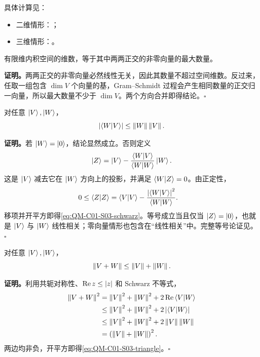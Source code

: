 具体计算见：
\begin{itemize}
  \item 二维情形：；
  \item 三维情形：。
\end{itemize}


\begin{theorem}
有限维内积空间的维数，等于其中两两正交的非零向量的最大数量。
\end{theorem}

\textbf{证明。}两两正交的非零向量必然线性无关，因此其数量不超过空间维数。反过来，任取一组包含 $\dim V$ 个向量的基，Gram--Schmidt 过程会产生相同数量的正交归一向量，所以最大数量不少于 $\dim V$。两个方向合并即得结论。\hfill$\square$


\begin{theorem}
对任意 $\ket{V},\ket{W}$，
\begin{equation}
  \abs{\braket{W}{V}}\leq\norm{W}\norm{V}.
  \label{eq:QM-C01-S03-schwarz}
\end{equation}
\end{theorem}

\textbf{证明。}若 $\ket{W}=\ket{0}$，结论显然成立。否则定义
\[
  \ket{Z}=\ket{V}
  -\frac{\braket{W}{V}}{\braket{W}{W}}\ket{W}.
\]
这是 $\ket{V}$ 减去它在 $\ket{W}$ 方向上的投影，并满足 $\braket{W}{Z}=0$。由正定性，
\begin{align*}
  0\leq\braket{Z}{Z}
  &=\braket{V}{V}
    -\frac{\abs{\braket{W}{V}}^2}{\braket{W}{W}}.
\end{align*}
移项并开平方即得\cref{eq:QM-C01-S03-schwarz}。等号成立当且仅当 $\ket{Z}=\ket{0}$，也就是 $\ket{V}$ 与 $\ket{W}$ 线性相关；零向量情形也包含在“线性相关”中。完整等号论证见。\hfill$\square$


\begin{theorem}[三角不等式]
对任意 $\ket{V},\ket{W}$，
\begin{equation}
  \norm{V+W}\leq\norm{V}+\norm{W}.
  \label{eq:QM-C01-S03-triangle}
\end{equation}
\end{theorem}

\textbf{证明。}利用共轭对称性、$\operatorname{Re}z\leq\abs{z}$ 和 Schwarz 不等式，
\begin{align*}
  \norm{V+W}^2
  &=\norm{V}^2+\norm{W}^2
    +2\operatorname{Re}\braket{V}{W}\\
  &\leq\norm{V}^2+\norm{W}^2+2\abs{\braket{V}{W}}\\
  &\leq\norm{V}^2+\norm{W}^2+2\norm{V}\norm{W}\\
  &=\left(\norm{V}+\norm{W}\right)^2.
\end{align*}
两边均非负，开平方即得\cref{eq:QM-C01-S03-triangle}。\hfill$\square$

